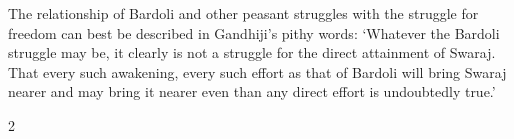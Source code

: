 \begin{multicols}{2}
The relationship of Bardoli and other peasant struggles with the struggle for freedom can best be described in Gandhiji's pithy words: `Whatever the Bardoli struggle may be, it clearly is not a struggle for the direct attainment of Swaraj. That every such awakening, every such effort as that of Bardoli will bring Swaraj nearer and may bring it nearer even than any direct effort is undoubtedly true.'
\end{multicols}{2}
